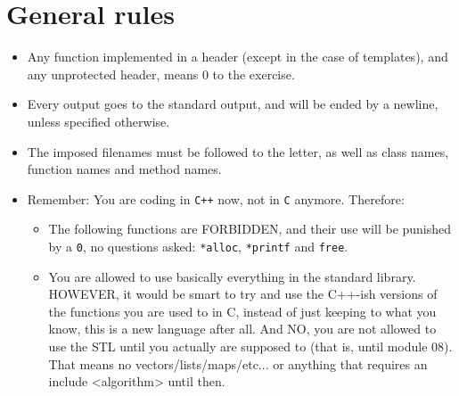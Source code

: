 

\chapter{General rules}


    \begin{itemize}

		\item Any function implemented in a header (except in the case of
		templates), and any unprotected header, means 0 to the exercise.

		\item Every output goes to the standard output, and will be
          ended by a newline, unless specified otherwise.

		\item The imposed filenames must be followed to the letter, as
          well as class names, function names and method names.

		\item Remember: You are coding in \texttt{C++} now, not in
          \texttt{C} anymore. Therefore:
		  
		  \begin{itemize}
		  
		  \item	The following functions are FORBIDDEN, and their use will be
		  punished by a \texttt{0}, no questions asked: \texttt{*alloc},
		  \texttt{*printf} and \texttt{free}.

		  \item You are allowed to use basically everything in the standard
		  library. HOWEVER, it would be smart to try and use the C++-ish
		  versions of the functions you are used to in C, instead of just
		  keeping to what you know, this is a new language after all. And NO,
		  you are not allowed to use the STL until you actually are supposed to
		  (that is, until module 08). That means no vectors/lists/maps/etc... or
		  anything that requires an include <algorithm> until then.


\end{itemize}
\end{itemize}
